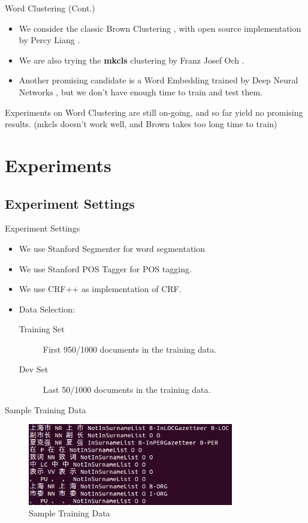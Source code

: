 \documentclass{beamer}
\begin{document}
\begin{frame}{Word Clustering (Cont.)}
	\begin{itemize}
		\item 
			We consider the classic Brown Clustering \citep{brown1992class}, with open source implementation by Percy Liang \citep{liang2005semi}.
			\pause
		\item We are also trying the \textbf{mkcls} clustering by Franz Josef Och \citep{och1999efficient}.
			\pause
		\item Another promising candidate is a Word Embedding trained by Deep Neural Networks \citep{turian2010word,collobert2011natural}, but we don't have enough time to train and test them.
	\end{itemize}
	\pause
	Experiments on Word Clustering are still on-going, and so far yield no promising results. (mkcls doesn't work well, and Brown takes too long time to train)
\end{frame}

\section{Experiments}
\subsection{Experiment Settings}
\frame{\sectionpage}

\begin{frame}{Experiment Settings}
	\begin{itemize}
		\item We use Stanford Segmenter\citep{tseng2005conditional} for word segmentation
			\pause
		\item We use Stanford POS Tagger\citep{toutanova2000enriching} for POS tagging.
			\pause
		\item We use CRF++ as implementation of CRF.
			\pause
		\item Data Selection:
			\begin{description}
				\item[Training Set] First 950/1000 documents in the training data.
				\item[Dev Set] Last 50/1000 documents in the training data.
			\end{description}
	\end{itemize}
\end{frame}

\begin{frame}{Sample Training Data}
	\begin{figure}[h]
		\centering
		\includegraphics[width=0.8\textwidth]{./figures/traindata.png}
		\caption{Sample Training Data}
		\label{fig:traindata}
	\end{figure}
\end{frame}
\end{document}
